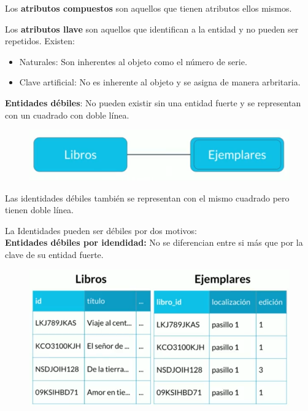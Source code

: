 \documentclass{article}
\begin{document}
Los \textbf{atributos compuestos} son aquellos que tienen atributos ellos
mismos.

Los \textbf{atributos llave} son aquellos que identifican a la entidad y no
pueden ser repetidos. Existen:

\begin{itemize}
  \item Naturales: Son inherentes al objeto como el número de serie.
  \item Clave artificial: No es inherente al objeto y se asigna de manera arbritaria.
\end{itemize}

\textbf{Entidades débiles}: No pueden existir sin una entidad fuerte y se representan
con un cuadrado con doble línea.

\begin{figure}[h!]
    \centering
      \includegraphics[scale=0.5]{./Pictures/005_entidades_debiles.png}
\end{figure}

Las identidades débiles también se representan con el mismo cuadrado pero
tienen doble línea.

La Identidades pueden ser débiles por dos motivos:\\

\textbf{Entidades débiles por idendidad:} No se diferencian entre si más que
por la clave de su entidad fuerte.

\begin{figure}[h!]
    \centering
      \includegraphics[scale=0.5]{./Pictures/006_entidades_debiles_dependientes.png}
\end{figure}
\end{document}
